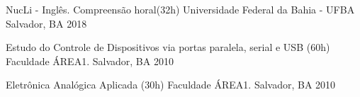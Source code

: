 

\begin{cvhonors}

  \cvhonor
    {NucLi - Inglês. Compreensão horal(32h)} %
    {Universidade Federal da Bahia - UFBA} %
    {Salvador, BA} %
    {2018} %
    

  \cvhonor
    {Estudo do Controle de Dispositivos via portas paralela, serial e USB (60h)} %
    {Faculdade ÁREA1.} %
    {Salvador, BA} %
    {2010} %

  \cvhonor
    {Eletrônica Analógica Aplicada (30h)} %
    {Faculdade ÁREA1.} %
    {Salvador, BA} %
    {2010} %

\end{cvhonors}
